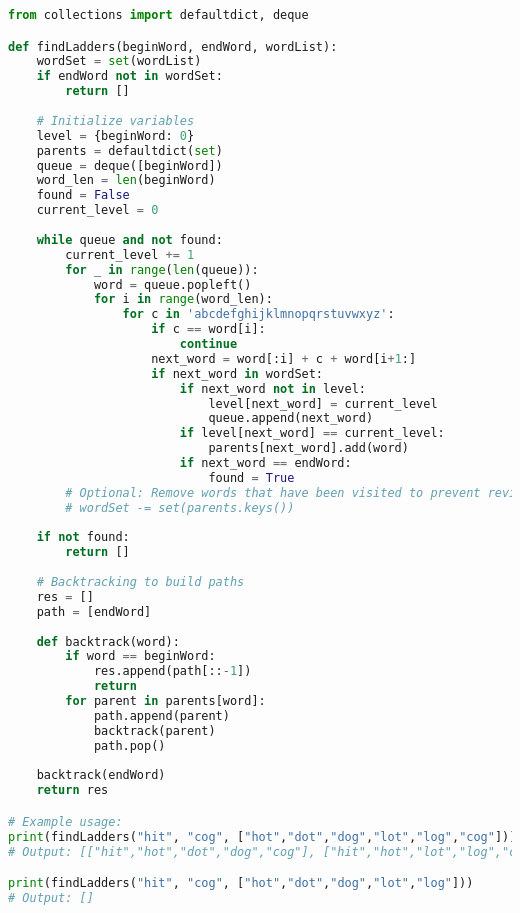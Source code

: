 \begin{fullwidth}
\begin{lstlisting}[language=Python]
from collections import defaultdict, deque

def findLadders(beginWord, endWord, wordList):
    wordSet = set(wordList)
    if endWord not in wordSet:
        return []
    
    # Initialize variables
    level = {beginWord: 0}
    parents = defaultdict(set)
    queue = deque([beginWord])
    word_len = len(beginWord)
    found = False
    current_level = 0
    
    while queue and not found:
        current_level += 1
        for _ in range(len(queue)):
            word = queue.popleft()
            for i in range(word_len):
                for c in 'abcdefghijklmnopqrstuvwxyz':
                    if c == word[i]:
                        continue
                    next_word = word[:i] + c + word[i+1:]
                    if next_word in wordSet:
                        if next_word not in level:
                            level[next_word] = current_level
                            queue.append(next_word)
                        if level[next_word] == current_level:
                            parents[next_word].add(word)
                        if next_word == endWord:
                            found = True
        # Optional: Remove words that have been visited to prevent revisiting
        # wordSet -= set(parents.keys())
    
    if not found:
        return []
    
    # Backtracking to build paths
    res = []
    path = [endWord]
    
    def backtrack(word):
        if word == beginWord:
            res.append(path[::-1])
            return
        for parent in parents[word]:
            path.append(parent)
            backtrack(parent)
            path.pop()
    
    backtrack(endWord)
    return res

# Example usage:
print(findLadders("hit", "cog", ["hot","dot","dog","lot","log","cog"]))
# Output: [["hit","hot","dot","dog","cog"], ["hit","hot","lot","log","cog"]]

print(findLadders("hit", "cog", ["hot","dot","dog","lot","log"]))
# Output: []
\end{lstlisting}
\end{fullwidth}

